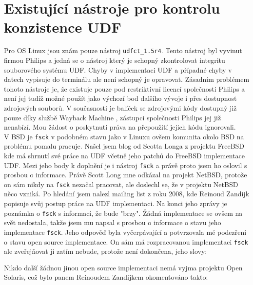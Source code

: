 \section{Existující nástroje pro kontrolu konzistence UDF}
Pro OS Linux jsou znám pouze nástroj \texttt{udfct\_1.5r4}. Tento nástroj byl vyvinut firmou Philips a jedná se o nástroj který je schopný zkontrolovat integritu souborového systému UDF. Chyby v implementaci UDF a případné chyby v datech vypisuje do terminálu ale není schopný je opravovat. Zásadním problémem tohoto nástroje je, že existuje pouze pod restriktivní licencí společnosti Philips a není jej tudíž možné použít jako výchozí bod dalšího vývoje i přes dostupnost zdrojových souborů. V současnosti je balíček se zdrojovými kódy dostupný již pouze díky službě Wayback Machine \cite{wayback}, zástupci společnosti Philips jej již nenabízí. Mou žádost o poskytnutí práva na přepoužití jejich kódu ignorovali.\\
V BSD je \texttt{fsck} v podobném stavu jako v Linuxu ovšem komunita okolo BSD na problému pomalu pracuje. Našel jsem blog \cite{scottuvblog} od Scotta Longa z projektu FreeBSD kde má shrnutí své práce na UDF včetně jeho patchů do FreeBSD implementace UDF. Mezi jeho body k doplnění je i nástroj \texttt{fsck} a právě proto jsem ho oslovil s prosbou o informace. Právě Scott Long mne odkázal na projekt NetBSD, protože on sám nikdy na \texttt{fsck} nezačal pracovat, ale doslechl se, že v projektu NetBSD něco vzniká. Po hledání jsem nalezl mailing list z roku 2008, kde Reinoud Zandijk popisuje svůj postup práce na UDF implementaci. Na konci jeho zprávy je poznámka o \texttt{fsck} s informací, že bude "brzy". Žádná implementace se ovšem na svět nedostala, takže jsem mu napsal s prosbou o informace o  stavu jeho implementace \texttt{fsck}. Jeho odpověď byla vyčerpávající a potvrzovala mé podezření o stavu open source implementace. On sám má rozpracovanou implementaci \texttt{fsck} ale zveřejňovat ji zatím nebude, protože není dokončena, jeho slovy: 
\begin{quote} 
\end{quote} 
Nikdo další žádnou jinou open source implementaci nemá vyjma projektu Open Solaris, což bylo panem Reinoudem Zandijkem okomentováno takto:
\begin{quote}
\end{quote}
